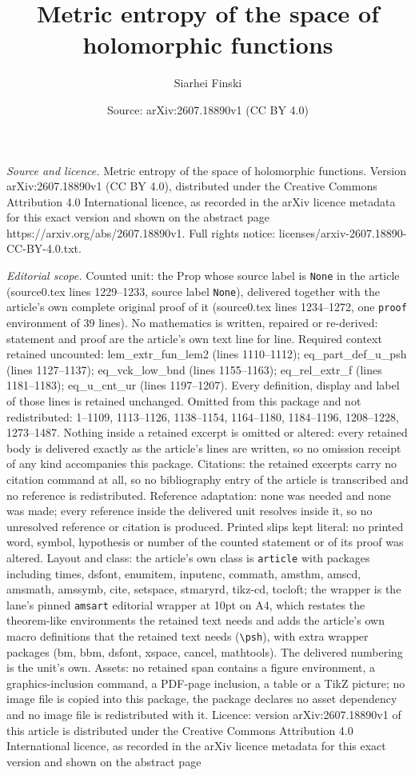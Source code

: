 \documentclass[10pt,a4paper]{amsart}
\title[Metric entropy of the space of holomorphic functions]{Metric entropy of the space of holomorphic functions}
\author{Siarhei Finski}
\date{Source: arXiv:2607.18890v1 (CC BY 4.0)}
\begin{document}
\maketitle

\noindent\emph{Source and licence.} Metric entropy of the space of holomorphic functions. Version arXiv:2607.18890v1 (CC BY 4.0), distributed under the Creative Commons Attribution 4.0 International licence, as recorded in the arXiv licence metadata for this exact version and shown on the abstract page https://arxiv.org/abs/2607.18890v1. Full rights notice: licenses/arxiv-2607.18890-CC-BY-4.0.txt.\par\smallskip

\noindent\textit{Editorial scope.} Counted unit: the Prop whose source label is \texttt{None} in the article (source0.tex lines 1229--1233, source label \texttt{None}), delivered together with the article's own complete original proof of it (source0.tex lines 1234--1272, one \texttt{proof} environment of 39 lines). No mathematics is written, repaired or re-derived: statement and proof are the article's own text line for line. Required context retained uncounted: lem\_extr\_fun\_lem2 (lines 1110--1112); eq\_part\_def\_u\_psh (lines 1127--1137); eq\_vck\_low\_bnd (lines 1155--1163); eq\_rel\_extr\_f (lines 1181--1183); eq\_u\_cnt\_ur (lines 1197--1207). Every definition, display and label of those lines is retained unchanged. Omitted from this package and not redistributed: 1--1109, 1113--1126, 1138--1154, 1164--1180, 1184--1196, 1208--1228, 1273--1487. Nothing inside a retained excerpt is omitted or altered: every retained body is delivered exactly as the article's lines are written, so no omission receipt of any kind accompanies this package. Citations: the retained excerpts carry no citation command at all, so no bibliography entry of the article is transcribed and no reference is redistributed. Reference adaptation: none was needed and none was made; every reference inside the delivered unit resolves inside it, so no unresolved reference or citation is produced. Printed slips kept literal: no printed word, symbol, hypothesis or number of the counted statement or of its proof was altered. Layout and class: the article's own class is \texttt{article} with packages including times, dsfont, enumitem, inputenc, commath, amsthm, amscd, amsmath, amssymb, cite, setspace, stmaryrd, tikz-cd, tocloft; the wrapper is the lane's pinned \texttt{amsart} editorial wrapper at 10pt on A4, which restates the theorem-like environments the retained text needs and adds the article's own macro definitions that the retained text needs (\texttt{\textbackslash psh}), with extra wrapper packages (bm, bbm, dsfont, xspace, cancel, mathtools). The delivered numbering is the unit's own. Assets: no retained span contains a figure environment, a graphics-inclusion command, a PDF-page inclusion, a table or a TikZ picture; no image file is copied into this package, the package declares no asset dependency and no image file is redistributed with it. Licence: version arXiv:2607.18890v1 of this article is distributed under the Creative Commons Attribution 4.0 International licence, as recorded in the arXiv licence metadata for this exact version and shown on the abstract page 
\end{document}
